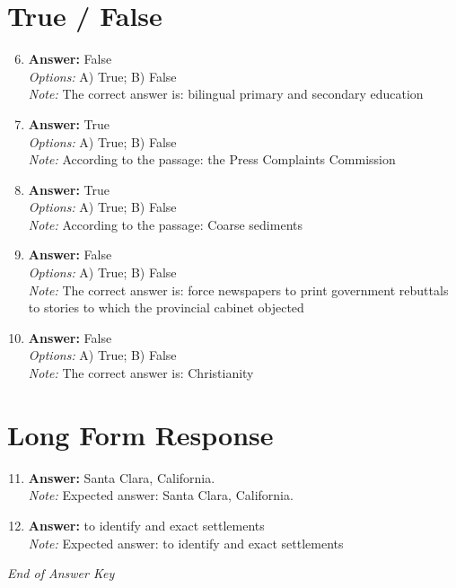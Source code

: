 \documentclass[12pt]{article}
\begin{document}
\section*{True / False}
\begin{enumerate}[label=\arabic*.]
\setcounter{enumi}{5}
\item \textbf{Answer:} False
\\ \textit{Options:} A) True; B) False
\\ \textit{Note:} The correct answer is: bilingual primary and secondary education
\item \textbf{Answer:} True
\\ \textit{Options:} A) True; B) False
\\ \textit{Note:} According to the passage: the Press Complaints Commission
\item \textbf{Answer:} True
\\ \textit{Options:} A) True; B) False
\\ \textit{Note:} According to the passage: Coarse sediments
\item \textbf{Answer:} False
\\ \textit{Options:} A) True; B) False
\\ \textit{Note:} The correct answer is: force newspapers to print government rebuttals to stories to which the provincial cabinet objected
\item \textbf{Answer:} False
\\ \textit{Options:} A) True; B) False
\\ \textit{Note:} The correct answer is: Christianity
\end{enumerate}

\section*{Long Form Response}
\begin{enumerate}[label=\arabic*.]
\setcounter{enumi}{10}
\item \textbf{Answer:} Santa Clara, California.
\\ \textit{Note:} Expected answer: Santa Clara, California.
\item \textbf{Answer:} to identify and exact settlements
\\ \textit{Note:} Expected answer: to identify and exact settlements
\end{enumerate}

\vfill
\noindent\textit{End of Answer Key}
\end{document}
